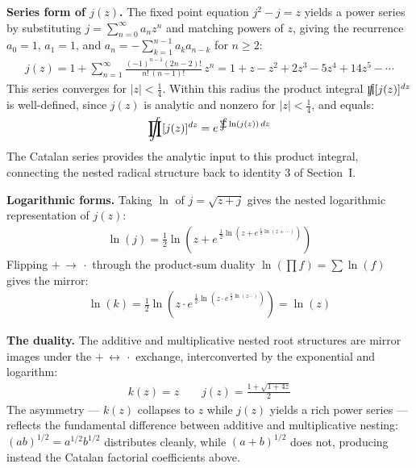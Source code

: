 \documentclass{article}
\DeclareMathOperator*{\SumInt}{%
\mathchoice%
  {\ooalign{$\displaystyle\sum$\cr\hidewidth$\displaystyle\int$\hidewidth\cr}}
  {\ooalign{\raisebox{.14\height}{\scalebox{.7}{$\textstyle\sum$}}\cr\hidewidth$\textstyle\int$\hidewidth\cr}}
  {\ooalign{\raisebox{.2\height}{\scalebox{.6}{$\scriptstyle\sum$}}\cr$\scriptstyle\int$\cr}}
  {\ooalign{\raisebox{.2\height}{\scalebox{.6}{$\scriptstyle\sum$}}\cr$\scriptstyle\int$\cr}}
}
\DeclareMathOperator*{\ProdInt}{%
\mathchoice%
  {\ooalign{$\displaystyle\prod$\cr\hidewidth$\displaystyle\int$\hidewidth\cr}}
  {\ooalign{\raisebox{.14\height}{\scalebox{.7}{$\textstyle\prod$}}\cr\hidewidth$\textstyle\int$\hidewidth\cr}}
  {\ooalign{\raisebox{.2\height}{\scalebox{.6}{$\scriptstyle\prod$}}\cr$\scriptstyle\int$\cr}}
  {\ooalign{\raisebox{.2\height}{\scalebox{.6}{$\scriptstyle\prod$}}\cr$\scriptstyle\int$\cr}}
}
\begin{document}
\textbf{Series form of $j(z)$.} The fixed point equation $j^2 - j = z$ yields a power series by substituting $j = \sum_{n=0}^{\infty} a_n z^n$ and matching powers of $z$, giving the recurrence $a_0 = 1$, $a_1 = 1$, and $a_n = -\sum_{k=1}^{n-1} a_k a_{n-k}$ for $n \geq 2$:
\begin{align*}
j(z) = 1 + \sum_{n=1}^{\infty} \frac{(-1)^{n-1}(2n-2)!}{n!\,(n-1)!}\, z^n = 1 + z - z^2 + 2z^3 - 5z^4 + 14z^5 - \cdots
\end{align*}
This series converges for $|z| < \tfrac{1}{4}$. Within this radius the product integral $\ProdInt [j(z)]^{dz}$ is well-defined, since $j(z)$ is analytic and nonzero for $|z| < \tfrac{1}{4}$, and equals:
\begin{align*}
\ProdInt [j(z)]^{dz} = e^{\,\SumInt \ln(j(z))\,dz}
\end{align*}
The Catalan series provides the analytic input to this product integral, connecting the nested radical structure back to identity 3 of Section~I.

\textbf{Logarithmic forms.} Taking $\ln$ of $j = \sqrt{z + j}$ gives the nested logarithmic representation of $j(z)$:
\begin{align*}
\ln(j) = \frac{1}{2}\ln\!\left(z + e^{\,\frac{1}{2}\ln\!\left(z + e^{\,\frac{1}{2}\ln(z + \cdots)}\right)}\right)
\end{align*}
Flipping $+\,\to\,\cdot$ through the product-sum duality $\ln\!\left(\prod f\right) = \sum \ln(f)$ gives the mirror:
\begin{align*}
\ln(k) = \frac{1}{2}\ln\!\left(z \cdot e^{\,\frac{1}{2}\ln\!\left(z \cdot e^{\,\frac{1}{2}\ln(z \cdots)}\right)}\right) = \ln(z)
\end{align*}

\textbf{The duality.} The additive and multiplicative nested root structures are mirror images under the $+\,\leftrightarrow\,\cdot$ exchange, interconverted by the exponential and logarithm:
\begin{align*}
k(z) = z \qquad j(z) = \frac{1 + \sqrt{1+4z}}{2}
\end{align*}
The asymmetry --- $k(z)$ collapses to $z$ while $j(z)$ yields a rich power series --- reflects the fundamental difference between additive and multiplicative nesting: $(ab)^{1/2} = a^{1/2}b^{1/2}$ distributes cleanly, while $(a+b)^{1/2}$ does not, producing instead the Catalan factorial coefficients above.
\end{document}
